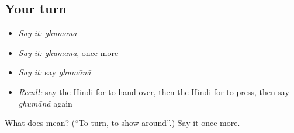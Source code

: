 \subsection*{Your turn}
\begin{itemize}
\raggedright
  \item \emph{Say it:} \emph{ghumānā}
  \item \emph{Say it:} \emph{ghumānā}, once more
  \item \emph{Say it:} say \emph{ghumānā}
  \item \emph{Recall:} say the Hindi for to hand over, then the Hindi for to press, then say \emph{ghumānā} again
\end{itemize}

\begin{tcolorbox}[breakable,colback=teal!4,colframe=teal!35!black,title={Before you move on}]
What does  mean? (\textquotedblleft{}To turn, to show around\textquotedblright{}.) Say it once more.
\end{tcolorbox}
